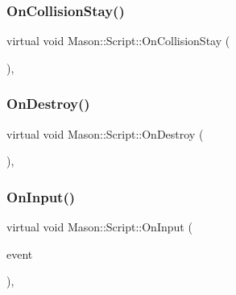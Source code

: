 \hypertarget{class_mason_1_1_script_a9649674f058f8e1b9229e93f3d9a34d7}{}\label{class_mason_1_1_script_a9649674f058f8e1b9229e93f3d9a34d7} 
\subsubsection{\texorpdfstring{On\+Collision\+Stay()}{OnCollisionStay()}}
{\footnotesize\ttfamily virtual void Mason\+::\+Script\+::\+On\+Collision\+Stay (\begin{DoxyParamCaption}{ }\end{DoxyParamCaption})\hspace{0.3cm}{\ttfamily [inline]}, {\ttfamily [virtual]}}

\hypertarget{class_mason_1_1_script_a59b174c3aa75b68a6f3d2b9803ee4287}{}\label{class_mason_1_1_script_a59b174c3aa75b68a6f3d2b9803ee4287} 
\subsubsection{\texorpdfstring{On\+Destroy()}{OnDestroy()}}
{\footnotesize\ttfamily virtual void Mason\+::\+Script\+::\+On\+Destroy (\begin{DoxyParamCaption}{ }\end{DoxyParamCaption})\hspace{0.3cm}{\ttfamily [inline]}, {\ttfamily [virtual]}}

\hypertarget{class_mason_1_1_script_a84fff8072c4e8b56fb242b29f3491224}{}\label{class_mason_1_1_script_a84fff8072c4e8b56fb242b29f3491224} 
\subsubsection{\texorpdfstring{On\+Input()}{OnInput()}}
{\footnotesize\ttfamily virtual void Mason\+::\+Script\+::\+On\+Input (\begin{DoxyParamCaption}\item[{S\+D\+L\+\_\+\+Event}]{event }\end{DoxyParamCaption})\hspace{0.3cm}{\ttfamily [inline]}, {\ttfamily [virtual]}}

